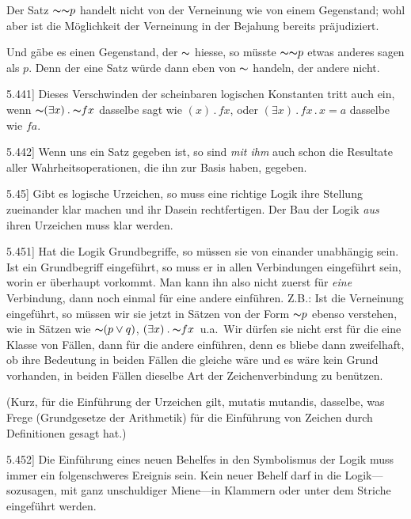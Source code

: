 \documentclass[12pt,oneside]{book}[2007/10/19]
\newcommand{\PropERef}[1]{\hyperref[PropE:#1]{#1}}
\newcommand{\PropositionG}[2]{%
  \item[\phantomsection\label{PropG:#1}\PropERef{#1}] #2%
}
\newcommand{\Not}[1]{\mathord{\thicksim} #1}
\newcommand{\DotOp}{\mathbin{.}}
\newcommand{\Emph}[1]{\emph{#1}}%
\newcommand{\ZumBeispiel}{Z.\;B.}
\newcommand{\undAndere}{u.\;a.}
\begin{document}
\begin{propositions}
{Der Satz \glqq{}$\Not{\Not{p}}$\grqq{} handelt nicht von der Verneinung
wie von einem Gegenstand; wohl aber ist
die Möglichkeit der Verneinung in der Bejahung
bereits präjudiziert.

Und gäbe es einen Gegenstand, der \glqq{}$\Not{}$\grqq{} hiesse,
so müsste \glqq{}$\Not{\Not{p}}$\grqq{} etwas anderes sagen als \glqq{}$p$\grqq{}.
Denn der eine Satz würde dann eben von $\Not{}$
handeln, der andere nicht.}


\PropositionG{5.441}
{Dieses Verschwinden der scheinbaren logischen
Konstanten tritt auch ein, wenn \glqq{}$\Not{(\exists x) \DotOp \Not{fx}}$\grqq{}
dasselbe sagt wie \glqq{}$(x) \DotOp fx$\grqq{}, oder \glqq{}$(\exists x) \DotOp fx \DotOp x = a$\grqq{}
dasselbe wie \glqq{}$fa$\grqq{}.}


\PropositionG{5.442}
{Wenn uns ein Satz gegeben ist, so sind \Emph{mit
ihm} auch schon die Resultate aller Wahrheitsoperationen,
die ihn zur Basis haben, gegeben.}


\PropositionG{5.45}
{Gibt es logische Urzeichen, so muss eine richtige
Logik ihre Stellung zueinander klar machen und
ihr Dasein rechtfertigen. Der Bau der Logik \Emph{aus}
ihren Urzeichen muss klar werden.}


\PropositionG{5.451}
{Hat die Logik Grundbegriffe, so müssen sie von
einander unabhängig sein. Ist ein Grundbegriff
eingeführt, so muss er in allen Verbindungen
eingeführt sein, worin er überhaupt vorkommt. Man
kann ihn also nicht zuerst für \Emph{eine} Verbindung,
dann noch einmal für eine andere einführen.
\ZumBeispiel: Ist die Verneinung eingeführt, so müssen
wir sie jetzt in Sätzen von der Form \glqq{}$\Not{p}$\grqq{} ebenso
verstehen, wie in Sätzen wie \glqq{}$\Not{(p \lor q)}$\grqq{}, \glqq{}$(\exists x) \DotOp \Not{fx}$\grqq{}~\undAndere\
Wir dürfen sie nicht erst für die eine Klasse
von Fällen, dann für die andere einführen, denn es
bliebe dann zweifelhaft, ob ihre Bedeutung in beiden
Fällen die gleiche wäre und es wäre kein Grund
vorhanden, in beiden Fällen dieselbe Art der
Zeichenverbindung zu benützen.

(Kurz, für die Einführung der Urzeichen gilt,
mutatis mutandis, dasselbe, was Frege (\glqq{}Grundgesetze
der Arithmetik\grqq{}) für die Einführung von
Zeichen durch Definitionen gesagt hat.)}


\PropositionG{5.452}
{Die Einführung eines neuen Behelfes in den Symbolismus
der Logik muss immer ein folgenschweres
Ereignis sein. Kein neuer Behelf darf in die Logik---sozusagen,
mit ganz unschuldiger Miene---in Klammern
oder unter dem Striche eingeführt werden.

}
\end{propositions}
\end{document}
